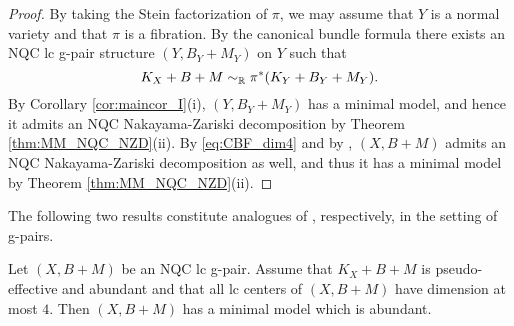 	\begin{proof}
		By taking the Stein factorization of $\pi$, we may assume that $Y$ is a normal variety and that $\pi$ is a fibration.
		By the canonical bundle formula \cite{Fil20,HanLiu21} there exists an NQC lc g-pair structure $ (Y,B_Y+M_Y) $ on $ Y $ such that
		\begin{equation}\label{eq:CBF_dim4}
			K_X+B+M \sim_{\mathbb{R}} \pi^*(K_Y+B_Y+M_Y) .
		\end{equation}
		By Corollary \ref{cor:maincor_I}(i), $ (Y,B_Y+M_Y)$ has a minimal model, and hence it admits an NQC Nakayama-Zariski decomposition by Theorem \ref{thm:MM_NQC_NZD}(ii). By \eqref{eq:CBF_dim4} and by \cite[Remark 3.21]{Tsak21}, $ (X,B+M) $ admits an NQC Nakayama-Zariski decomposition as well, and thus it has a minimal model by Theorem \ref{thm:MM_NQC_NZD}(ii).
	\end{proof}
	
	The following two results constitute analogues of \cite[Corollaries 3.13 and 3.12]{Hash20d}, respectively, in the setting of g-pairs.
	
	\begin{cor}\label{cor:Hash20d_3.13}
		Let $(X,B+M)$ be an NQC lc g-pair. Assume that $K_X+B+M$ is pseudo-effective and abundant and that all lc centers of $(X,B+M)$ have dimension at most $ 4 $. Then $(X,B+M)$ has a minimal model which is abundant.
	\end{cor}
	
